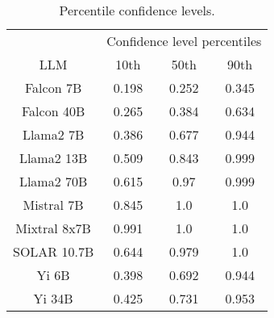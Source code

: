 \begin{table*}
\centering
\begin{tabular}{c|c|c|c}
& \multicolumn{3}{c}{Confidence level percentiles} \\ 
LLM & 10th & 50th & 90th\\ \hline
Falcon 7B & 0.198 & 0.252 & 0.345\\
Falcon 40B & 0.265 & 0.384 & 0.634\\
Llama2 7B & 0.386 & 0.677 & 0.944\\
Llama2 13B & 0.509 & 0.843 & 0.999\\
Llama2 70B & 0.615 & 0.97 & 0.999\\
Mistral 7B & 0.845 & 1.0 & 1.0\\
Mixtral 8x7B & 0.991 & 1.0 & 1.0\\
SOLAR 10.7B & 0.644 & 0.979 & 1.0\\
Yi 6B & 0.398 & 0.692 & 0.944\\
Yi 34B & 0.425 & 0.731 & 0.953\\
\hline
\end{tabular}
\caption{Percentile confidence levels.}
\label{tab:percentile_conf}
\end{table*}
